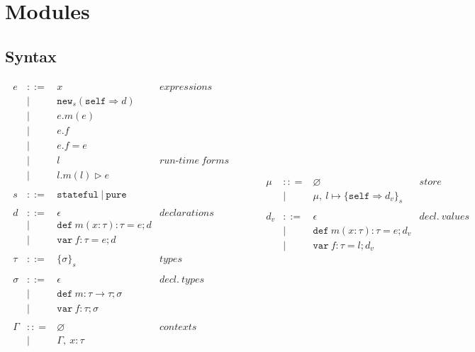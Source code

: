 \documentclass{llncs}
\newcommand{\keywadj}[1]{\mathtt{#1}}
\newcommand{\keyw}[1]{\keywadj{#1}~}
\begin{document}
\section{Modules}

\subsection{Syntax}

\[
\begin{array}{lll}
\begin{array}{lllr}
e & ::= & x & expressions \\
& | & \keywadj{new}_{s}(\keywadj{self} \Rightarrow d) \\
& | & e.m(e)\\
& | & e.f \\
& | & e.f = e \\
& | & l & run\mbox{-}time~forms\\
& | & l.m(l) \rhd e \\
&&\\
s & ::= & \keyw{stateful} | ~\keyw{pure} \\
&&\\
d & ::= & \epsilon & declarations \\
  & |   & \keyw{def} m(x:\tau):\tau = e; d \\
  & |   & \keyw{var} f:\tau = e; d \\
&&\\
\tau & ::= & \{ \sigma \}_{s} & types \\
&&\\
\sigma & ::= & \epsilon & decl.~ types \\
       & |   & \keyw{def} m:\tau \rightarrow \tau; \sigma \\
       & |   & \keyw{var} f:\tau; \sigma \\
&&\\
\Gamma & :: = & \varnothing & contexts\\
& | & \Gamma,~x : \tau\\
\end{array}
& ~~~~~~
&
\begin{array}{lllr}
\mu & :: = & \varnothing & store\\
& | & \mu,~l \mapsto \{ \keywadj{self} \Rightarrow d_v \}_{s}\\
&&\\
d_v & ::= & \epsilon & decl.~ values \\
  & |   & \keyw{def} m(x:\tau):\tau = e; d_v \\
  & |   & \keyw{var} f:\tau = l; d_v \\

\end{array}
\end{array}\]
\end{document}
